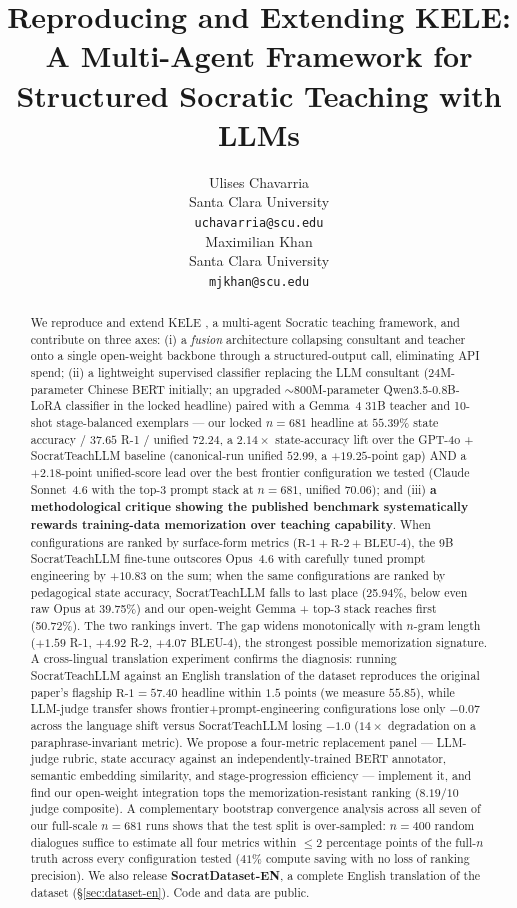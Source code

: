 \documentclass[11pt]{article}
\title{Reproducing and Extending KELE: A Multi-Agent Framework for Structured Socratic Teaching with LLMs}
\author{Ulises Chavarria \\
  Santa Clara University \\
  \texttt{uchavarria@scu.edu} \\\And
  Maximilian Khan \\
  Santa Clara University \\
  \texttt{mjkhan@scu.edu} \\}
\begin{document}
\maketitle

\begin{abstract}
We reproduce and extend KELE \citep{peng2025kele}, a multi-agent Socratic teaching framework, and contribute on three axes: (i) a \emph{fusion} architecture collapsing consultant and teacher onto a single open-weight backbone through a structured-output call, eliminating API spend; (ii) a lightweight supervised classifier replacing the LLM consultant (24M-parameter Chinese BERT initially; an upgraded $\sim$800M-parameter Qwen3.5-0.8B-LoRA classifier in the locked headline) paired with a Gemma~4 31B teacher and 10-shot stage-balanced exemplars --- our locked $n{=}681$ headline at $\mathbf{55.39\%}$ state accuracy / $\mathbf{37.65}$ R-1 / unified $\mathbf{72.24}$, a $\mathbf{2.14\times}$ state-accuracy lift over the GPT-4o + SocratTeachLLM baseline (canonical-run unified $52.99$, a $+19.25$-point gap) AND a $\mathbf{+2.18}$-point unified-score lead over the best frontier configuration we tested (Claude Sonnet~4.6 with the top-3 prompt stack at $n{=}681$, unified $70.06$); and (iii) \textbf{a methodological critique showing the published benchmark systematically rewards training-data memorization over teaching capability}. When configurations are ranked by surface-form metrics ($\text{R-1}+\text{R-2}+\text{BLEU-4}$), the 9B SocratTeachLLM fine-tune outscores Opus~4.6 with carefully tuned prompt engineering by $+10.83$ on the sum; when the same configurations are ranked by pedagogical state accuracy, SocratTeachLLM falls to last place (25.94\%, below even raw Opus at 39.75\%) and our open-weight Gemma + top-3 stack reaches first (50.72\%). The two rankings invert. The gap widens monotonically with $n$-gram length ($+1.59$ R-1, $+4.92$ R-2, $+4.07$ BLEU-4), the strongest possible memorization signature. A cross-lingual translation experiment confirms the diagnosis: running SocratTeachLLM against an English translation of the dataset reproduces the original paper's flagship $\text{R-1} = 57.40$ headline within $1.5$ points (we measure $55.85$), while LLM-judge transfer shows frontier+prompt-engineering configurations lose only $-0.07$ across the language shift versus SocratTeachLLM losing $-1.0$ ($14\times$ degradation on a paraphrase-invariant metric). We propose a four-metric replacement panel --- LLM-judge rubric, state accuracy against an independently-trained BERT annotator, semantic embedding similarity, and stage-progression efficiency --- implement it, and find our open-weight integration tops the memorization-resistant ranking ($8.19/10$ judge composite). A complementary bootstrap convergence analysis across all seven of our full-scale $n{=}681$ runs shows that the test split is over-sampled: $n{=}400$ random dialogues suffice to estimate all four metrics within $\leq 2$ percentage points of the full-$n$ truth across every configuration tested ($41\%$ compute saving with no loss of ranking precision). We also release \textbf{SocratDataset-EN}, a complete English translation of the dataset (\S\ref{sec:dataset-en}). Code and data are public.
\end{abstract}
\end{document}
